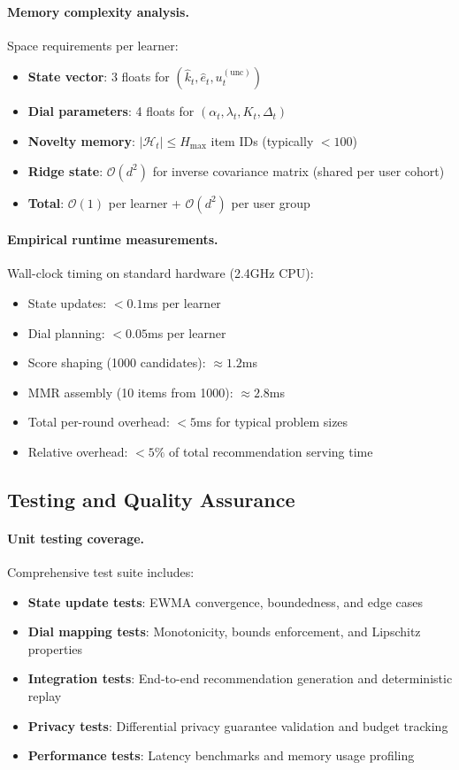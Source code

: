 \paragraph{Memory complexity analysis.} Space requirements per learner:
\begin{itemize}
  \item \textbf{State vector}: 3 floats for $(\widehat{k}_t, \widehat{e}_t, u_t^{(\mathrm{unc})})$
  \item \textbf{Dial parameters}: 4 floats for $(\alpha_t, \lambda_t, K_t, \Delta_t)$
  \item \textbf{Novelty memory}: $|\mathcal{H}_t| \leq H_{\max}$ item IDs (typically $< 100$)
  \item \textbf{Ridge state}: $\mathcal{O}(d^2)$ for inverse covariance matrix (shared per user cohort)
  \item \textbf{Total}: $\mathcal{O}(1)$ per learner + $\mathcal{O}(d^2)$ per user group
\end{itemize}

\paragraph{Empirical runtime measurements.} Wall-clock timing on standard hardware (2.4GHz CPU):
\begin{itemize}
  \item State updates: $< 0.1$ms per learner
  \item Dial planning: $< 0.05$ms per learner
  \item Score shaping (1000 candidates): $\approx 1.2$ms
  \item MMR assembly (10 items from 1000): $\approx 2.8$ms
  \item Total per-round overhead: $< 5$ms for typical problem sizes
  \item Relative overhead: $< 5\%$ of total recommendation serving time
\end{itemize}

\subsection{Testing and Quality Assurance}
\label{app:testing}

\paragraph{Unit testing coverage.} Comprehensive test suite includes:
\begin{itemize}
  \item \textbf{State update tests}: EWMA convergence, boundedness, and edge cases
  \item \textbf{Dial mapping tests}: Monotonicity, bounds enforcement, and Lipschitz properties
  \item \textbf{Integration tests}: End-to-end recommendation generation and deterministic replay
  \item \textbf{Privacy tests}: Differential privacy guarantee validation and budget tracking
  \item \textbf{Performance tests}: Latency benchmarks and memory usage profiling
\end{itemize}

